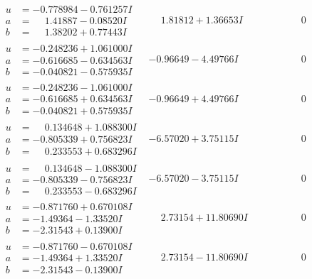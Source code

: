\documentclass[1p]{elsarticle_modified}
\theoremstyle{definition}
\begin{document}
$$\begin{array}{c|c|c}
\begin{aligned}
u &= -0.778984 - 0.761257 I \\
a &= \phantom{-}1.41887 - 0.08520 I \\
b &= \phantom{-}1.38202 + 0.77443 I\end{aligned}
 & \phantom{-}1.81812 + 1.36653 I & \phantom{-0.000000 } 0 \\ \hline\begin{aligned}
u &= -0.248236 + 1.061000 I \\
a &= -0.616685 - 0.634563 I \\
b &= -0.040821 - 0.575935 I\end{aligned}
 & -0.96649 - 4.49766 I & \phantom{-0.000000 } 0 \\ \hline\begin{aligned}
u &= -0.248236 - 1.061000 I \\
a &= -0.616685 + 0.634563 I \\
b &= -0.040821 + 0.575935 I\end{aligned}
 & -0.96649 + 4.49766 I & \phantom{-0.000000 } 0 \\ \hline\begin{aligned}
u &= \phantom{-}0.134648 + 1.088300 I \\
a &= -0.805339 + 0.756823 I \\
b &= \phantom{-}0.233553 + 0.683296 I\end{aligned}
 & -6.57020 + 3.75115 I & \phantom{-0.000000 } 0 \\ \hline\begin{aligned}
u &= \phantom{-}0.134648 - 1.088300 I \\
a &= -0.805339 - 0.756823 I \\
b &= \phantom{-}0.233553 - 0.683296 I\end{aligned}
 & -6.57020 - 3.75115 I & \phantom{-0.000000 } 0 \\ \hline\begin{aligned}
u &= -0.871760 + 0.670108 I \\
a &= -1.49364 - 1.33520 I \\
b &= -2.31543 + 0.13900 I\end{aligned}
 & \phantom{-}2.73154 + 11.80690 I & \phantom{-0.000000 } 0 \\ \hline\begin{aligned}
u &= -0.871760 - 0.670108 I \\
a &= -1.49364 + 1.33520 I \\
b &= -2.31543 - 0.13900 I\end{aligned}
 & \phantom{-}2.73154 - 11.80690 I & \phantom{-0.000000 } 0 \\ \hline\begin{aligned}

\end{aligned}
\end{array}$$
\end{document}
